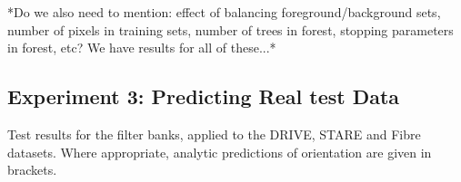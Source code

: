 \documentclass{IEEEtran}
\begin{document}
*Do we also need to mention: effect of balancing foreground/background sets, number of pixels in training sets, number of trees in forest, stopping parameters in forest, etc? We have results for all of these...*

\subsection{Experiment 3: Predicting Real test Data}
\label{s:experiments_3}
%
\begin{table}[t]
\centering
\small

\caption{Test results for the filter banks, applied to the DRIVE, STARE and Fibre datasets. Where appropriate, analytic predictions of orientation are given in brackets.}
\label{t:test_all}
\end{table}
\end{document}

